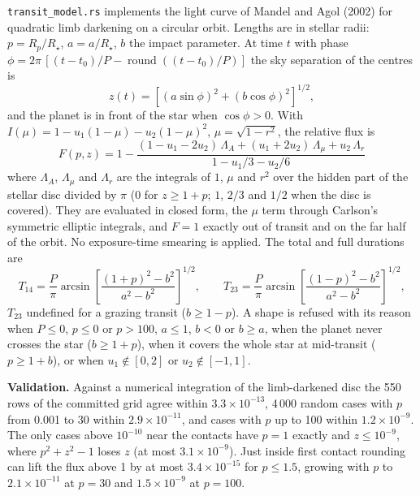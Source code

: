 \documentclass[11pt,a4paper]{article}
\newcommand{\code}[1]{\texttt{\small #1}}
\begin{document}
    \code{transit\_model.rs} implements the light curve of Mandel and Agol (2002) for quadratic limb darkening on a circular orbit. Lengths are in stellar radii: $p = R_p/R_\star$, $a = a/R_\star$, $b$ the impact parameter. At time $t$ with phase $\phi = 2\pi\,[(t - t_0)/P - \operatorname{round}((t - t_0)/P)]$ the sky separation of the centres is
    \begin{equation}
        z(t) = \left[(a \sin\phi)^2 + (b \cos\phi)^2\right]^{1/2},
    \end{equation}
    and the planet is in front of the star when $\cos\phi > 0$. With $I(\mu) = 1 - u_1(1 - \mu) - u_2(1 - \mu)^2$, $\mu = \sqrt{1 - r^2}$, the relative flux is
    \begin{equation}
        \boxed{
        F(p, z) = 1 - \frac{(1 - u_1 - 2u_2)\,\Lambda_A + (u_1 + 2u_2)\,\Lambda_\mu + u_2\,\Lambda_r}{1 - u_1/3 - u_2/6}
        }
    \end{equation}
    where $\Lambda_A$, $\Lambda_\mu$ and $\Lambda_r$ are the integrals of $1$, $\mu$ and $r^2$ over the hidden part of the stellar disc divided by $\pi$ (0 for $z \ge 1 + p$; $1$, $2/3$ and $1/2$ when the disc is covered). They are evaluated in closed form, the $\mu$ term through Carlson's symmetric elliptic integrals, and $F = 1$ exactly out of transit and on the far half of the orbit. No exposure-time smearing is applied. The total and full durations are
    \begin{equation}
        T_{14} = \frac{P}{\pi} \arcsin\!\left[\frac{(1 + p)^2 - b^2}{a^2 - b^2}\right]^{1/2}, \qquad
        T_{23} = \frac{P}{\pi} \arcsin\!\left[\frac{(1 - p)^2 - b^2}{a^2 - b^2}\right]^{1/2},
    \end{equation}
    $T_{23}$ undefined for a grazing transit ($b \ge 1 - p$). A shape is refused with its reason when $P \le 0$, $p \le 0$ or $p > 100$, $a \le 1$, $b < 0$ or $b \ge a$, when the planet never crosses the star ($b \ge 1 + p$), when it covers the whole star at mid-transit ($p \ge 1 + b$), or when $u_1 \notin [0, 2]$ or $u_2 \notin [-1, 1]$.

    \textbf{Validation.} Against a numerical integration of the limb-darkened disc the 550 rows of the committed grid agree within $3.3 \times 10^{-13}$, 4\,000 random cases with $p$ from 0.001 to 30 within $2.9 \times 10^{-11}$, and cases with $p$ up to 100 within $1.2 \times 10^{-9}$. The only cases above $10^{-10}$ near the contacts have $p = 1$ exactly and $z \le 10^{-9}$, where $p^2 + z^2 - 1$ loses $z$ (at most $3.1 \times 10^{-9}$). Just inside first contact rounding can lift the flux above 1 by at most $3.4 \times 10^{-15}$ for $p \le 1.5$, growing with $p$ to $2.1 \times 10^{-11}$ at $p = 30$ and $1.5 \times 10^{-9}$ at $p = 100$.
\end{document}
